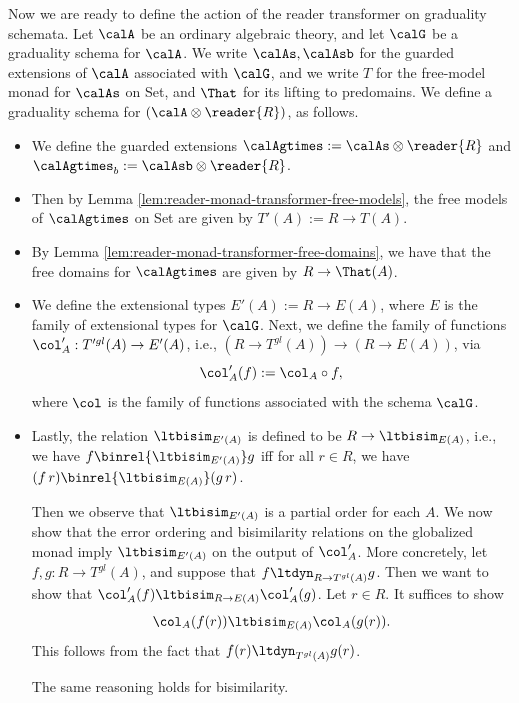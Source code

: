 Now we are ready to define the action of the reader transformer on graduality
schemata. Let $\calA$ be an ordinary algebraic theory, and let $\calG$ be a
graduality schema for $\calA$.
%
We write $\calAs, \calAsb$ for the guarded extensions of $\calA$ associated with
$\calG$, and we write $T$ for the free-model monad for $\calAs$ on Set, and
$\That$ for its lifting to predomains.
%
We define a graduality schema for $(\calA \otimes \reader{R})$, as follows.
\begin{itemize}
    \item We define the guarded extensions 
    $\calAgtimes := \calAs \otimes \reader{R}$ and 
    $\calAgtimes_b := \calAsb \otimes \reader{R}$.

    \item Then by Lemma \ref{lem:reader-monad-transformer-free-models}, the free models of
    $\calAgtimes$ on Set are given by $T'(A) := R \to T(A)$.

    \item By Lemma \ref{lem:reader-monad-transformer-free-domains}, we have that 
    the free domains for $\calAgtimes$ are given by $R \to \That(A)$.

    \item We define the extensional types $E'(A) := R \to E(A)$, where
    $E$ is the family of extensional types for $\calG$. Next, we define the
    family of functions
    $\col'_A : T'^{gl}(A) \to E'(A)$, i.e., $(R \to T^{gl}(A)) \to (R \to E(A))$, via 
    \[ \col'_A(f) := \col_{A} \circ f, \]
    where $\col$ is the family of functions associated with the schema $\calG$.

    \item Lastly, the relation $\ltbisim_{E'(A)}$ is defined to be $R \to
    \ltbisim_{E(A)}$, i.e., we have $f \binrel{\ltbisim_{E'(A)}} g$ iff
    for all $r \in R$, we have $(f\, r) \binrel{\ltbisim_{E(A)}} (g\, r)$.
    
    Then we observe that $\ltbisim_{E'(A)}$ is a partial order for each $A$. We
    now show that the error ordering and bisimilarity relations on the
    globalized monad imply $\ltbisim_{E'(A)}$ on the output of $\col'_A$.
    More concretely, let $f, g : R \to T^{gl}(A)$, and suppose that 
    $f \ltdyn_{R \to T^{gl}(A)} g$. Then we want to show that
    $\col'_A(f) \ltbisim_{R \to E(A)} \col'_A(g)$. Let $r \in R$.
    It suffices to show
    \[ \col_{A}(f(r)) \ltbisim_{E(A)} \col_{A}(g(r)). \] 
    This follows from the fact that $f(r) \ltdyn_{T^{gl}(A)} g(r)$.

    The same reasoning holds for bisimilarity.
\end{itemize}












